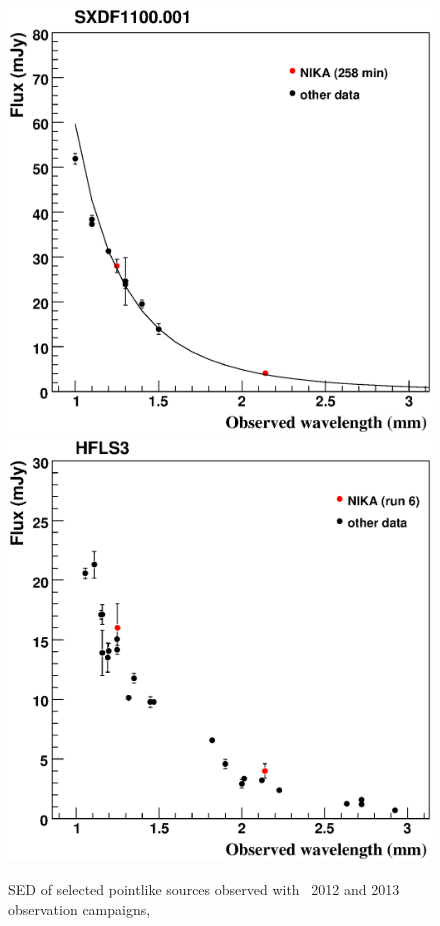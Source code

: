 \begin{figure}[t]
\begin{center}
\includegraphics[scale=0.35,angle=0]{figures/plotSXDF.eps}
\includegraphics[scale=0.35,angle=0]{figures/plotSEDHFLS.eps}
\caption{SED of selected pointlike sources observed with \NIKA\ 2012 and 2013 observation campaigns, 
}
\end{center}
\end{figure}

